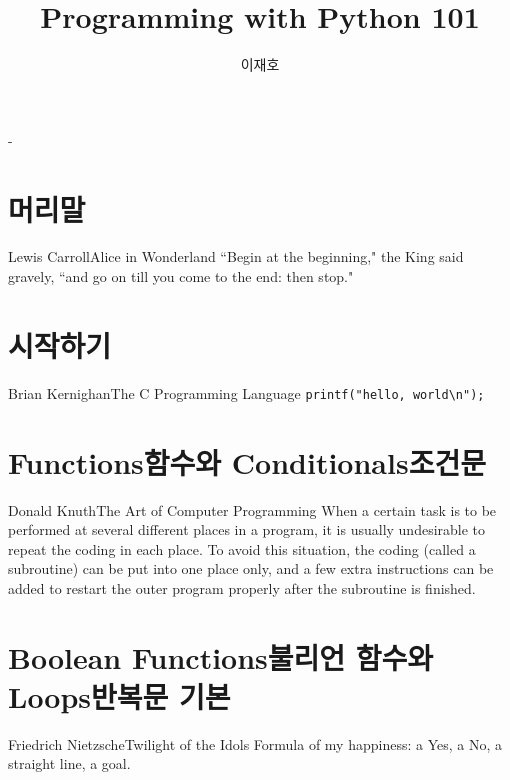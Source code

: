 \documentclass[a4paper,10pt]{memoir}
\title{Programming with Python 101}
\author{이재호}
\date{}
\begin{document}
\frontmatter
\begin{titlingpage}
  \setlength{\droptitle}{10.5cm}
  \calccentering{\unitlength}
  \begin{adjustwidth*}{\unitlength}{-\unitlength}
    \maketitle
  \end{adjustwidth*}
\end{titlingpage}

\tableofcontents

\chapter{머리말}
\begin{epi}{Lewis Carroll}{Alice in Wonderland}
  ``Begin at the beginning," the King said gravely, ``and go on till you come to the end: then stop."
\end{epi}


\mainmatter
\chapter{시작하기}
\begin{epi}{Brian Kernighan}{The C Programming Language}
  \texttt{printf("hello, world\textbackslash n");}
\end{epi}


\chapter{Functions함수와 Conditionals조건문}
\begin{epi}{Donald Knuth}{The Art of Computer Programming}
  When a certain task is to be performed at several different places in a program, it is usually undesirable to repeat the coding in each place.
  To avoid this situation, the coding (called a subroutine) can be put into one place only, and a few extra instructions can be added to restart the outer program properly after
the subroutine is finished.
\end{epi}


\chapter{Boolean Functions불리언 함수와 Loops반복문 기본}
\begin{epi}{Friedrich Nietzsche}{Twilight of the Idols}
  Formula of my happiness: a Yes, a No, a straight line, a goal.
\end{epi}

\end{document}

